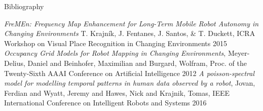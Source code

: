 \documentclass{beamer}
\begin{document}
\begin{frame}[label=bibliography]{Bibliography}
  \begin{thebibliography}{9}
        \emph{FreMEn: Frequency Map Enhancement for Long-Term Mobile Robot Autonomy in Changing Environments}
        T. Krajník, J. Fentanes, J. Santos, \& T. Duckett,
        ICRA Workshop on Visual Place Recognition in Changing Environments
        2015
        \emph{Occupancy Grid Models for Robot Mapping in Changing Environments},
        Meyer-Delius, Daniel and Beinhofer, Maximilian and Burgard, Wolfram,
        Proc. of the Twenty-Sixth AAAI Conference on Artificial Intelligence
        2012
        \emph{A poisson-spectral model for modelling temporal patterns in human data observed by a robot},
        Jovan, Ferdian and Wyatt, Jeremy and Hawes, Nick and Krajnik, Tomas,
        IEEE International Conference on Intelligent Robots and Systems
        2016
  \end{thebibliography}
\end{frame}
\end{document}
